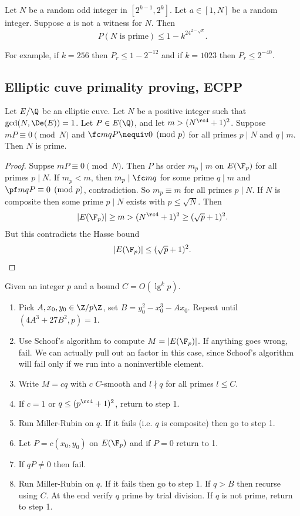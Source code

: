 \begin{thm}
Let $N$ be a random odd integer in $[2^{k-1}, 2^k]$. Let $a\in [1,N]$ be a random integer. Suppose $a$ is not a witness for $N$. Then 
\[P(N\text{ is prime})\le 1-k^24^{2-\sqrt k}.\]
\end{thm}
For example, if $k=256$ then $P_r\le 1-2^{-12}$ and if $k=1023$ then $P_r\le 2^{-40}$.

\subsection{Elliptic cuve primality proving, ECPP}
\begin{thm}
Let $E/\Q$ be an elliptic cuve. Let $N$ be a positive integer such that $\gcd(N,\De(E))=1$. Let $P\in E(\Q)$, and let $m>(N^{\rc 4}+1)^2$. Suppose $mP\equiv 0\pmod N$ and $\fc mqP\nequiv 0\pmod p$ for all primes $p\mid N$ and $q\mid m$. Then $N$ is prime.
\end{thm}
\begin{proof}
Suppse $mP\equiv 0\pmod N$. Then $P$ hs order $m_p\mid m$ on $E(\F_p)$ for all primes $p\mid N$. If $m_p<m$, then $m_p\mid \fc mq$ for some prime $q\mid m$ and $\pf mq P\equiv 0\pmod p$, contradiction. So $m_p\equiv m$ for all primes $p\mid N$. If $N$ is composite then some prime $p\mid N$ exists with $p\le \sqrt N$. Then
\[
|E(\F_p)|\ge m>(N^{\rc 4}+1)^2\ge (\sqrt p+1)^2.
\]
But this contradicts the Hasse bound
\[
|E(\F_p)|\le (\sqrt{p}+1)^2.
\]
\end{proof}
\begin{alg}
Given an integer $p$ and a bound $C=O(\lg^k p)$.
\begin{enumerate}
\item
Pick $A,x_0,y_0\in \Z/p\Z$, set $B=y_0^2-x_0^3-Ax_0$. Repeat until $(4A^3+27B^2,p)=1$.
\item
Use Schoof's algorithm to compute $M=|E(\F_p)|$. If anything goes wrong, fail.
We can actually pull out an factor in this case, since Schoof's algorithm will fail only if we run into a noninvertible element.
\item
Write $M=cq$ with $c$ $C$-smooth and $l\nmid q$ for all primes $l\le C$.
\item
If $c=1$ or $q\le (p^{\rc 4}+1)^2$, return to step 1.
\item
Run Miller-Rubin on $q$. If it fails (i.e. $q$ is composite) then go to step 1.
\item Let $P=c(x_0,y_0)$ on $E(\F_p)$ and if $P=0$ return to 1.
\item If $qP\ne 0$ then fail.
\item Run Miller-Rubin on $q$. If it fails then go to step 1.
If $q>B$ then recurse using $C$. At the end verify $q$ prime by trial division. If $q$ is not prime, return to step 1. 
\end{enumerate}
\end{alg}
